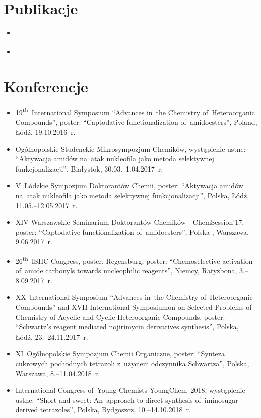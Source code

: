 \section{Publikacje}\label{intro:publications}
\begin{itemize}
  \item \cite{wieclaw21}
  \item \cite{stecko18}
\end{itemize}

\section{Konferencje}\label{intro:conferences}
\begin{fullwidth}
\begin{itemize}
  \item 19\textsuperscript{th}~International Symposium \enquote{Advances in~the Chemistry of~Heteroorganic Compounds}, poster: \enquote{Captodative functionalization of~amidoesters}, Poland, Łódź, 19.10.2016~r.
  \item Ogólnopolskie Studenckie Mikrosympozjum Chemików, wystąpienie ustne: \enquote{Aktywacja amidów na~atak nukleofila jako metoda selektywnej funkcjonalizacji}, Białystok, 30.03.\-–1.04.2017~r.
  \item V~Łódzkie Sympozjum Doktorantów Chemii, poster: \enquote{Aktywacja amidów na~atak nukleofila jako metoda selektywnej funkcjonalizacji}, Polska, Łódź, 11.05.\-–12.05.2017~r.
  \item XIV Warszawskie Seminarium Doktorantów Chemików - ChemSession’17, poster: \enquote{Captodative functionalization of~amidoesters}, Polska , Warszawa, 9.06.2017~r.
  \item 26\textsuperscript{th}~ISHC Congress, poster, Regensburg, poster: \enquote{Chemoselective activation of~amide carbonyls towards nucleophilic reagents}, Niemcy, Ratyzbona, 3.\-–8.09.2017~r.
  \item XX~International Symposium \enquote{Advances in~the Chemistry of~Heteroorganic Compounds} and XVII International Symposiumon on Selected Problems of Chemistry of Acyclic and Cyclic Heteroorganic Compounds, poster: \enquote{Schwartz’s reagent mediated nojirimycin derivatives synthesis}, Polska, Łódź, 23.\-–24.11.2017~r.
  \item XI~Ogólnopolskie Sympozjum Chemii Organiczne, poster: \enquote{Synteza cukrowych pochodnych tetrazoli z~użyciem odczynnika Schwartza}, Polska, Warszawa, 8.\-–11.04.2018~r.
  \item International Congress of~Young Chemists YoungChem~2018, wystąpienie ustne: \enquote{Short and sweet: An~approach to direct synthesis of~iminosugar-derived tetrazoles}, Polska, Bydgoszcz, 10.\-–14.10.2018~r.

\end{itemize}
\end{fullwidth}
